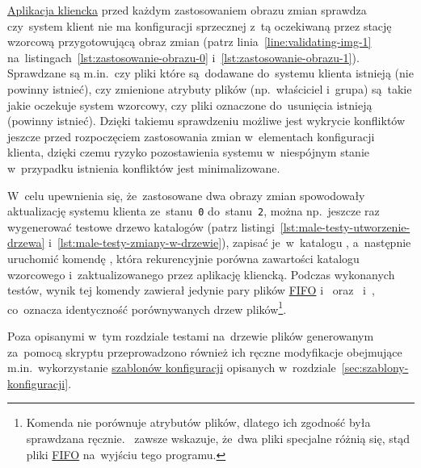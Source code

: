 \documentclass[thesis]{subfiles}
\begin{document}
\hyperref[sec:cli-app]{Aplikacja kliencka} przed każdym zastosowaniem obrazu zmian sprawdza czy~system klient nie ma konfiguracji sprzecznej z~tą oczekiwaną przez stację wzorcową przygotowującą obraz zmian (patrz linia~\ref{line:validating-img-1} na~listingach~\ref{lst:zastosowanie-obrazu-0} i~\ref{lst:zastosowanie-obrazu-1}). Sprawdzane są m.in.~czy pliki które są~dodawane do~systemu klienta istnieją (nie powinny istnieć), czy zmienione atrybuty plików (np.~właściciel i~grupa) są~takie jakie oczekuje system wzorcowy, czy pliki oznaczone do~usunięcia istnieją (powinny istnieć). Dzięki takiemu sprawdzeniu możliwe jest wykrycie konfliktów jeszcze przed rozpoczęciem zastosowania zmian w~elementach konfiguracji klienta, dzięki czemu ryzyko pozostawienia systemu w~niespójnym stanie w~przypadku istnienia konfliktów jest minimalizowane.

W~celu upewnienia się, że~zastosowane dwa obrazy zmian spowodowały aktualizację systemu klienta ze~stanu~\texttt{0} do~stanu~\texttt{2}, można np.~jeszcze raz wygenerować testowe drzewo katalogów (patrz listingi~\ref{lst:male-testy-utworzenie-drzewa} i~\ref{lst:male-testy-zmiany-w-drzewie}), zapisać je~w~katalogu , a~następnie uruchomić komendę , która rekurencyjnie porówna zawartości katalogu wzorcowego i~zaktualizowanego przez aplikację kliencką. Podczas wykonanych testów, wynik tej komendy zawierał jedynie pary plików \href{https://en.wikipedia.org/wiki/Named_pipe}{FIFO}  i~ oraz~ i~, co~oznacza identyczność porównywanych drzew plików\footnote{Komenda  nie porównuje atrybutów plików, dlatego ich zgodność była sprawdzana ręcznie. ~zawsze wskazuje, że~dwa pliki specjalne różnią się, stąd pliki \href{https://en.wikipedia.org/wiki/Named_pipe}{FIFO} na~wyjściu tego programu.}.

Poza opisanymi w~tym rozdziale testami na~drzewie plików generowanym za~pomocą skryptu  przeprowadzono również ich ręczne modyfikacje obejmujące m.in.~wykorzystanie \hyperref[sec:szablony-konfiguracji]{szablonów konfiguracji} opisanych w~rozdziale~\ref{sec:szablony-konfiguracji}.
\end{document}
